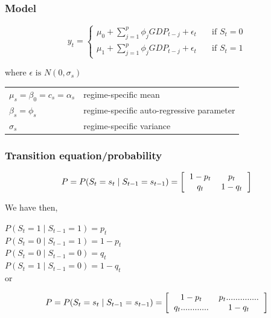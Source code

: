 \documentclass{article}[]
\begin{document}
\subsubsection{Model}




\begin{equation}
y_{t} =   
  \begin{cases}
    \mu_{0} + \sum^p_{j = 1} \phi_j GDP_{t-j} + \epsilon_t      & \quad \text{if } S_t = 0 \\
    \mu_{1} + \sum^p_{j = 1} \phi_j GDP_{t-j} + \epsilon_t      & \quad \text{if } S_t = 1
  \end{cases}
\end{equation}

where $\epsilon \text{ is } N(0,\sigma_s)$


\begin{tabular}{l l}
    $\mu_{s} = \beta_0 = c_s = \alpha_s $    & regime-specific mean    \\
    $\beta_{s} = \phi_s$ & regime-specific  auto-regressive parameter \\
    $\sigma_{s}$ & regime-specific variance    \\

\end{tabular}

\subsubsection{Transition equation/probability}

\begin{equation}
    P = P(S_t = s_t \mid S_{t-1} = s_{t-1}) = 
\left[ \begin{tabular}{c c}
            $1 - p_{t}$	& $p_{t}$ \\ 
            $q_{t}$	& $1 - q_{t}$ \\ 
\end{tabular} \right]
\end{equation}

We have then,

$P(S_t = 1 \mid S_{t-1} = 1) = p_t$   \\ 
$P(S_t = 0 \mid S_{t-1} = 1) = 1 - p_t$ \\
$P(S_t = 0 \mid S_{t-1} = 0) = q_t$   \\
$P(S_t = 1 \mid S_{t-1} = 0) = 1- q_t$ \\

or 

\begin{equation}
    P = P(S_t = s_t \mid S_{t-1} = s_{t-1}) = 
\left[ \begin{tabular}{c c}
            $1 - p_{t}$	& $p_{t} ..............$ \\ 
            $q_{t} ............$	& $1 - q_{t}$ \\ 
\end{tabular} \right]
\end{equation}
\end{document}
